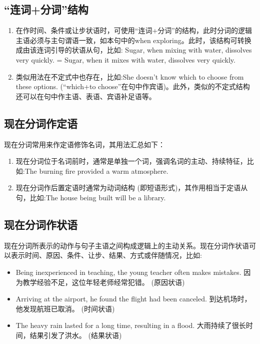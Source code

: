 \subsection{“连词+分词”结构}

\begin{enumerate}
  \item 在作时间、条件或让步状语时，可使用“连词+分词”的结构，此时分词的逻辑主语必须与主句谓语一致，如本句中的when exploring。此时，该结构可转换成由该连词引导的状语从句，比如: Sugar, when mixing with water, dissolves very quickly. = Sugar, when it mixes with water, dissolves very quickly.
  \item 类似用法在不定式中也存在，比如:She doesn't know which to choose from these options. (“which+to choose”在句中作宾语)。此外，类似的不定式结构还可以在句中作主语、表语、宾语补足语等。
\end{enumerate}

\subsection{现在分词作定语}

现在分词常用来作定语修饰名词，其用法汇总如下：
\begin{enumerate}
  \item 现在分词位于名词前时，通常是单独一个词，强调名词的主动、持续特征，比如:The burning fire provided a warm atmosphere.
  \item 现在分词作后置定语时通常为动词结构 (即短语形式)，其作用相当于定语从句，比如:The house being built will be a library.
\end{enumerate}

\subsection{现在分词作状语}

现在分词所表示的动作与句子主语之间构成逻辑上的主动关系。现在分词作状语可以表示时间、原因、条件、让步、结果、方式或伴随情况，比如:
\begin{itemize}
  \item Being inexperienced in teaching, the young teacher often makes mistakes. 因为教学经验不足，这位年轻老师经常犯错。 (原因状语)
  \item Arriving at the airport, he found the flight had been canceled. 到达机场时，他发现航班已取消。 (时间状语)
  \item The heavy rain lasted for a long time, resulting in a flood. 大雨持续了很长时间，结果引发了洪水。 (结果状语)
\end{itemize}


